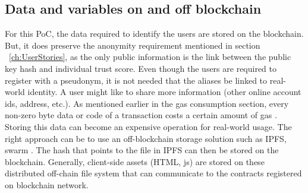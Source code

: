 \subsection{Data and variables on and off blockchain}
For this PoC, the data required to identify the users are stored on the
blockchain. But, it does preserve the anonymity requirement mentioned in
section ~\ref{ch:UserStories}, as the only public information is the link
between the public key hash and individual trust score. Even though the users
are required to register with a pseudonym, it is not needed that the aliases be
linked to real-world identity. A user might like to share more
information (other online account ids, address, etc.). As mentioned earlier in
the gas consumption section, every non-zero byte data or code of a transaction
costs a certain amount of gas \cite{buterin2013ethereum}. Storing this data can
become an expensive operation for real-world usage. The right approach can be
to use an off-blockchain storage solution such as IPFS, swarm
\cite{benet2014ipfs}. The hash that points to the file in IPFS can then be
stored on the blockchain.  Generally, client-side assets (HTML, js) are stored
on these distributed off-chain file system that can communicate to the
contracts registered on blockchain network. 

